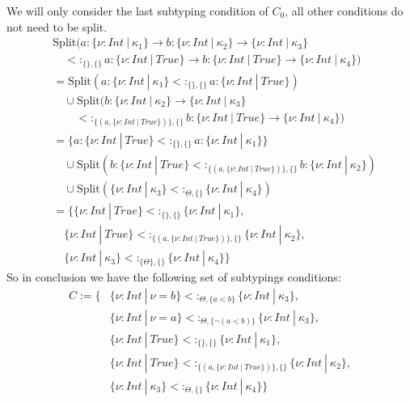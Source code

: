 \documentclass[]{scrbook}
\theoremstyle{definition}
\theoremstyle{definition}
\theoremstyle{definition}
\theoremstyle{remark}
\begin{document}
We will only consider the last subtyping condition of \(C_0\), all other
conditions do not need to be split. \[
\begin{aligned}
  &\text{Split}(a:\{\nu:\mathit{Int}\ |\ \kappa_1\}\to b:\{\nu:\mathit{Int}\ |\ \kappa_2\}\to\{\nu:\mathit{Int}\ |\ \kappa_3\}\\
  &\quad<:_{\{\},\{\}}a:\{\nu:\mathit{Int}\ |\ \mathit{True}\}\to b:\{\nu:\mathit{Int}\ |\ \mathit{True}\}\to\{\nu:\mathit{Int}\ |\ \kappa_4\})\\
  & = \text{Split}(a:\{\nu:\mathit{Int}\ |\ \kappa_1\}<:_{\{\},\{\}}a:\{\nu:\mathit{Int}\ |\ \mathit{True}\})\\
  &\quad\cup\text{Split}(b:\{\nu:\mathit{Int}\ |\ \kappa_2\}\to\{\nu:\mathit{Int}\ |\ \kappa_3\}\\
  &\quad\quad<:_{\{(a,\{\nu:\mathit{Int}\ |\ \mathit{True}\})\},\{\}}b:\{\nu:\mathit{Int}\ |\ \mathit{True}\}\to\{\nu:\mathit{Int}\ |\ \kappa_4\})\\
  & = \{a:\{\nu:\mathit{Int}\ |\ \mathit{True}\}<:_{\{\},\{\}}a:\{\nu:\mathit{Int}\ |\ \kappa_1\}\}\\
  &\quad\cup\text{Split}(b:\{\nu:\mathit{Int}\ |\ \mathit{True}\}<:_{\{(a,\{\nu:\mathit{Int}\ |\  \mathit{True}\})\},\{\}}b:\{\nu:\mathit{Int}\ |\ \kappa_2\})\\
  &\quad\cup\text{Split}(\{\nu:\mathit{Int}\  |\ \kappa_3\}<:_{\Theta,\{\}}\{\nu:\mathit{Int}\ |\ \kappa_4\})\\
  & = \{\{\nu:\mathit{Int}\ |\ \mathit{True}\}<:_{\{\},\{\}}\{\nu:\mathit{Int}\ |\ \kappa_1\},\\
  &\quad \{\nu:\mathit{Int}\ |\ \mathit{True}\}<:_{\{(a,\{\nu:\mathit{Int}\ |\ \mathit{True}\})\},\{\}}\{\nu:\mathit{Int}\ |\ \kappa_2\},\\
  &\quad\{\nu:\mathit{Int}\ |\ \kappa_3\}<:_{\{\Theta\},\{\}}\{\nu:\mathit{Int}\ |\ \kappa_4\}\}
\end{aligned}
\] So in conclusion we have the following set of subtypings conditions:
\[
\begin{aligned}
C:=\{&\{\nu:\mathit{Int}\ |\ \nu = b\}<:_{\Theta,\{a < b\}}\{\nu:\mathit{Int}\ |\ \kappa_3\},\\
  &\{\nu:\mathit{Int}\ |\ \nu = a\}<:_{\Theta,\{\neg (a < b)\}}\{\nu:\mathit{Int}\ |\ \kappa_3\},\\
  &\{\nu:\mathit{Int}\ |\ \mathit{True}\}<:_{\{\},\{\}}\{\nu:\mathit{Int}\ |\ \kappa_1\},\\
  &\{\nu:\mathit{Int}\ |\ \mathit{True}\}<:_{\{(a,\{\nu:\mathit{Int}\ |\ \mathit{True}\})\},\{\}}\{\nu:\mathit{Int}\ |\ \kappa_2\},\\
  &\{\nu:\mathit{Int}\ |\ \kappa_3\}<:_{\Theta,\{\}}\{\nu:\mathit{Int}\ |\ \kappa_4\}\}
\end{aligned}
\]
\end{document}
